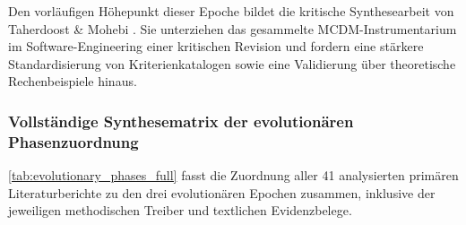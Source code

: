 Den vorläufigen Höhepunkt dieser Epoche bildet die kritische Synthesearbeit von Taherdoost \& Mohebi \cite{LPC92LAP}. Sie unterziehen das gesammelte MCDM-Instrumentarium im Software-Engineering einer kritischen Revision und fordern eine stärkere Standardisierung von Kriterienkatalogen sowie eine Validierung über theoretische Rechenbeispiele hinaus.

\subsubsection{Vollständige Synthesematrix der evolutionären Phasenzuordnung}

\autoref{tab:evolutionary_phases_full} fasst die Zuordnung aller 41 analysierten primären Literaturberichte zu den drei evolutionären Epochen zusammen, inklusive der jeweiligen methodischen Treiber und textlichen Evidenzbelege.


